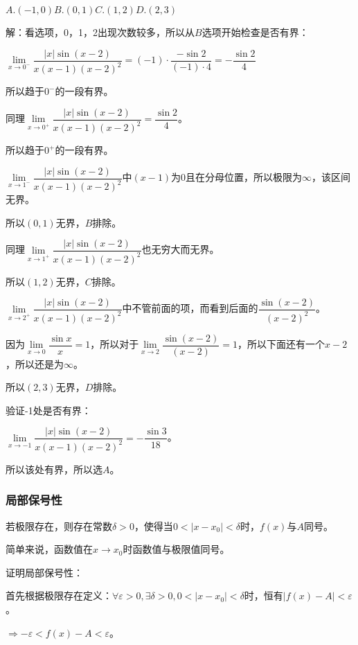 \documentclass[UTF8, 12pt]{ctexart}
\begin{document}
$A.(-1,0)$\qquad$B.(0,1)$\qquad$C.(1,2)$\qquad$D.(2,3)$\medskip

解：看选项，0，1，2出现次数较多，所以从$B$选项开始检查是否有界：\medskip

$\lim\limits_{x\to 0^-}\dfrac{\vert x\vert\sin(x-2)}{x(x-1)(x-2)^2}=(-1)\cdot\dfrac{-\sin 2}{(-1)\cdot 4}=-\dfrac{\sin 2}{4}$\medskip

所以趋于$0^-$的一段有界。\medskip

同理$\lim\limits_{x\to 0^+}\dfrac{\vert x\vert\sin(x-2)}{x(x-1)(x-2)^2}=\dfrac{\sin 2}{4}$。\medskip

所以趋于$0^+$的一段有界。\medskip

$\lim\limits_{x\to 1^-}\dfrac{\vert x\vert\sin(x-2)}{x(x-1)(x-2)^2}$中$(x-1)$为0且在分母位置，所以极限为$\infty$，该区间无界。\medskip

所以$(0,1)$无界，$B$排除。\medskip

同理$\lim\limits_{x\to 1^+}\dfrac{\vert x\vert\sin(x-2)}{x(x-1)(x-2)^2}$也无穷大而无界。\medskip

所以$(1,2)$无界，$C$排除。\medskip

$\lim\limits_{x\to 2^+}\dfrac{\vert x\vert\sin(x-2)}{x(x-1)(x-2)^2}$中不管前面的项，而看到后面的$\dfrac{\sin(x-2)}{(x-2)^2}$。\medskip

因为$\lim\limits_{x\to 0}\dfrac{\sin x}{x}=1$，所以对于$\lim\limits_{x\to 2}\dfrac{\sin(x-2)}{(x-2)}=1$，所以下面还有一个$x-2$，所以还是为$\infty$。

所以$(2,3)$无界，$D$排除。\medskip

验证-1处是否有界：\medskip

$\lim\limits_{x\to -1}\dfrac{\vert x\vert\sin(x-2)}{x(x-1)(x-2)^2}=-\dfrac{\sin 3}{18}$。\medskip

所以该处有界，所以选$A$。

\subsubsection{局部保号性}

若极限存在，则存在常数$\delta>0$，使得当$0<\vert x-x_0\vert<\delta$时，$f(x)$与$A$同号。

简单来说，函数值在$x\to x_0$时函数值与极限值同号。

证明局部保号性：

首先根据极限存在定义：$\forall\varepsilon>0,\exists\delta>0,0<\vert x-x_0\vert<\delta$时，恒有$\vert f(x)-A\vert<\varepsilon$。

$\Rightarrow -\varepsilon<f(x)-A<\varepsilon$。
\end{document}
